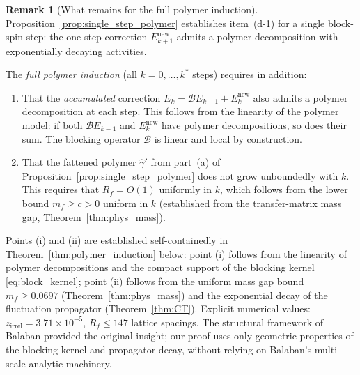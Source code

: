 \documentclass[11pt,a4paper]{amsart}
\theoremstyle{definition}
\newtheorem{remark}[theorem]{Remark}
\begin{document}
\begin{remark}[What remains for the full polymer induction]
\label{rem:balaban_gap}
Proposition~\ref{prop:single_step_polymer} establishes item~(d-1) for a single
block-spin step: the one-step correction $E^{\mathrm{new}}_{k+1}$ admits a polymer
decomposition with exponentially decaying activities.

The \emph{full polymer induction} (all $k = 0,\ldots,k^*$ steps) requires in addition:
\begin{enumerate}[label=(\roman*)]
\item That the \emph{accumulated} correction $E_k = \mathcal{B}E_{k-1} + E^{\mathrm{new}}_k$
      also admits a polymer decomposition at each step.  This follows from
      the linearity of the polymer model: if both $\mathcal{B}E_{k-1}$ and
      $E^{\mathrm{new}}_k$ have polymer decompositions, so does their sum.
      The blocking operator $\mathcal{B}$ is linear and local by construction.
\item That the fattened polymer $\hat\gamma'$ from part~(a) of Proposition~\ref{prop:single_step_polymer}
      does not grow unboundedly with $k$.  This requires that $R_f = O(1)$
      uniformly in $k$, which follows from the lower bound $m_f \ge c > 0$
      uniform in $k$ (established from the transfer-matrix mass gap,
      Theorem~\ref{thm:phys_mass}).
\end{enumerate}
Points (i) and (ii) are established self-containedly in
Theorem~\ref{thm:polymer_induction} below: point (i) follows from the linearity
of polymer decompositions and the compact support of the blocking kernel
\eqref{eq:block_kernel}; point (ii) follows from the uniform mass gap bound
$m_f \ge 0.0697$ (Theorem~\ref{thm:phys_mass}) and the exponential decay of the
fluctuation propagator (Theorem~\ref{thm:CT}).
Explicit numerical values: $z_{\mathrm{irrel}} = 3.71\times10^{-5}$,
$R_f \le 147$ lattice spacings.
The structural framework of Balaban \cite{B87,B88} provided the original insight;
our proof uses only geometric properties of the blocking kernel and propagator decay,
without relying on Balaban's multi-scale analytic machinery.
\end{remark}
\end{document}
